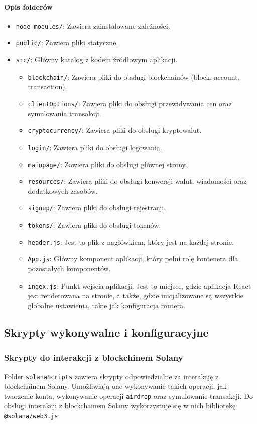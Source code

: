 \paragraph{Opis folderów}
\begin{itemize}
    \item \texttt{node\_modules/}: Zawiera zainstalowane zależności.
    \item \texttt{public/}: Zawiera pliki statyczne.
    \item \texttt{src/}: Główny katalog z kodem źródłowym aplikacji.
    \begin{itemize}
        \item \texttt{blockchain/}: Zawiera pliki do obsługi blockchainów (block, account, transaction).
        \item \texttt{clientOptions/}: Zawiera pliki do obsługi przewidywania cen oraz symulowania transakcji.
        \item \texttt{cryptocurrency/}: Zawiera pliki do obsługi kryptowalut.
        \item \texttt{login/}: Zawiera pliki do obsługi logowania.
        \item \texttt{mainpage/}: Zawiera pliki do obsługi głównej strony.
        \item \texttt{resources/}: Zawiera pliki do obsługi konwersji walut, wiadomości oraz dodatkowych zasobów.
        \item \texttt{signup/}: Zawiera pliki do obsługi rejestracji.
        \item \texttt{tokens/}: Zawiera pliki do obsługi tokenów.
        \item \texttt{header.js}: Jest to plik z nagłówkiem, który jest na każdej stronie.
        \item \texttt{App.js}: Główny komponent aplikacji, który pełni rolę kontenera dla pozostałych komponentów.
        \item \texttt{index.js}: Punkt wejścia aplikacji. Jest to miejsce, gdzie aplikacja React jest renderowana na stronie, a także, gdzie inicjalizowane są wszystkie globalne ustawienia, takie jak konfiguracja routera.
    \end{itemize}
\end{itemize}

\subsection{Skrypty wykonywalne i konfiguracyjne}
\subsubsection{Skrypty do interakcji z blockchinem Solany}
Folder \texttt{solanaScripts} zawiera skrypty odpowiedzialne za interakcję z blockchainem Solany. Umożliwiają one wykonywanie takich operacji, jak tworzenie konta, wykonywanie operacji \texttt{airdrop} oraz symulowanie transakcji. Do obsługi interakcji z blockchainem Solany wykorzystuje się w nich bibliotekę \texttt{@solana/web3.js}

